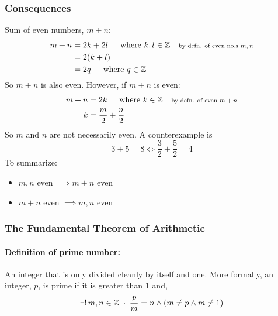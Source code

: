 \documentclass[../MathsNotesBase.tex]{subfiles}
\begin{document}
{		\subsubsection{Consequences}
		Sum of even numbers, $m + n$:
		\begin{align*}
		m + n &= 2k + 2l \hspace{15pt} \text{where $k,l \in \mathbb{Z}^{}$} &\text{\scriptsize{by defn. of even no.s $m,n$}} \\
 &= 2(k + l) \\
 &= 2q      \hspace{15pt} \text{where $q \in \mathbb{Z}^{}$}
		\end{align*}
		So $m + n$ is also even.
		However, if $m + n$ is even:
		\begin{align*}
		m + n &= 2k \hspace{15pt} \text{where $k \in \mathbb{Z}^{}$} &\text{\scriptsize{by defn. of even $m + n$}} \\
		k &= \frac{m}{2} + \frac{n}{2}\\
		\end{align*}
		So $m$ and $n$ are not necessarily even. A counterexample is 
		\[3 + 5 = 8 \iff \frac{3}{2} + \frac{5}{2} = 4 \]
		To summarize:
		\begin{itemize}
		\item{$m,n$ even $ \implies m + n$ even}
		\item{$m + n$ even $ \implies m,n$ even \wrong} 
		\end{itemize}

	
		\pagebreak
		\subsubsection{The Fundamental Theorem of Arithmetic}\bigskip
		
		\paragraph{Definition of prime number:} An integer that is only divided cleanly by itself and one.
		More formally, an integer, $p$, is prime if it is greater than 1 and,
		\[ \exists!\,m,n \in \mathbb{Z}^{\;} \cdot \;\frac{p}{m} = n \wedge (m \neq p \wedge m \neq 1) \]
		
}
\end{document}
